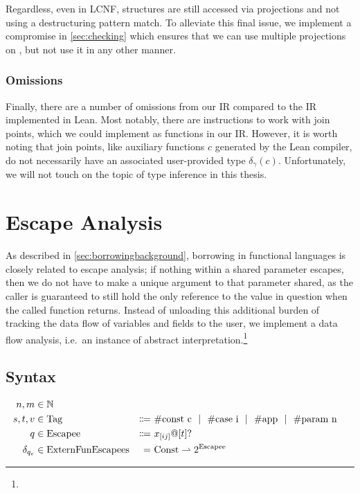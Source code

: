Regardless, even in LCNF, structures are still accessed via projections and not using a destructuring pattern match. To alleviate this final issue, we implement a compromise in \cref{sec:checking} which ensures that we can use multiple projections on , but not use it in any other manner.

\subsubsection{Omissions}
Finally, there are a number of omissions from our IR compared to the IR implemented in Lean. Most notably, there are instructions to work with join points, which we could implement as functions in our IR. However, it is worth noting that join points, like auxiliary functions $c$ generated by the Lean compiler, do not necessarily have an associated user-provided type $\delta_\gamma(c)$. Unfortunately, we will not touch on the topic of type inference in this thesis.

\newcommand{\Tag}{\mathrm{Tag}}
\newcommand{\Escapee}{\mathrm{Escapee}}
\newcommand{\ExternFunEscapees}{\mathrm{ExternFunEscapees}}

\section{Escape Analysis}\label{sec:escapeanalysis}
As described in \cref{sec:borrowingbackground}, borrowing in functional languages is closely related to escape analysis; if nothing within a shared parameter escapes, then we do not have to make a unique argument to that parameter shared, as the caller is guaranteed to still hold the only reference to the value in question when the called function returns. Instead of unloading this additional burden of tracking the data flow of variables and fields to the user, we implement a data flow analysis, i.e.\ an instance of abstract interpretation.\footnote{}

\subsection{Syntax}

\begin{alignat*}{3}
  n, m &\in \mathbb{N} \\
  s, t, v &\in \Tag &\Coloneqq&\ \#\textrm{const c} \sep \#\textrm{case i} \sep \#\textrm{app} \sep \#\textrm{param n} \\
  q &\in \Escapee\ &\Coloneqq&\ x_{[ij]} @ [t]? \\
  \delta_{q_e} &\in \ExternFunEscapees &=&\ \Const \rightharpoonup 2^{\Escapee}
\end{alignat*}

